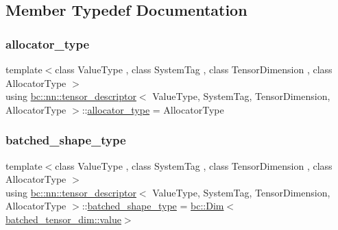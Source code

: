 \subsection{Member Typedef Documentation}
\mbox{\label{structbc_1_1nn_1_1tensor__descriptor_aeca4d7720d1a19acea4d9166e3af80a3}} 
\subsubsection{\texorpdfstring{allocator\+\_\+type}{allocator\_type}}
{\footnotesize\ttfamily template$<$class Value\+Type , class System\+Tag , class Tensor\+Dimension , class Allocator\+Type $>$ \\
using \hyperlink{structbc_1_1nn_1_1tensor__descriptor}{bc\+::nn\+::tensor\+\_\+descriptor}$<$ Value\+Type, System\+Tag, Tensor\+Dimension, Allocator\+Type $>$\+::\hyperlink{structbc_1_1nn_1_1tensor__descriptor_aeca4d7720d1a19acea4d9166e3af80a3}{allocator\+\_\+type} =  Allocator\+Type}

\mbox{\label{structbc_1_1nn_1_1tensor__descriptor_a5791f524a799083405bc9dc0f9761e36}} 
\subsubsection{\texorpdfstring{batched\+\_\+shape\+\_\+type}{batched\_shape\_type}}
{\footnotesize\ttfamily template$<$class Value\+Type , class System\+Tag , class Tensor\+Dimension , class Allocator\+Type $>$ \\
using \hyperlink{structbc_1_1nn_1_1tensor__descriptor}{bc\+::nn\+::tensor\+\_\+descriptor}$<$ Value\+Type, System\+Tag, Tensor\+Dimension, Allocator\+Type $>$\+::\hyperlink{structbc_1_1nn_1_1tensor__descriptor_a5791f524a799083405bc9dc0f9761e36}{batched\+\_\+shape\+\_\+type} =  \hyperlink{structbc_1_1Dim}{bc\+::\+Dim}$<$\hyperlink{structbc_1_1traits_1_1Integer_a853b05936b98e64c79163395c3624e32}{batched\+\_\+tensor\+\_\+dim\+::value}$>$}

